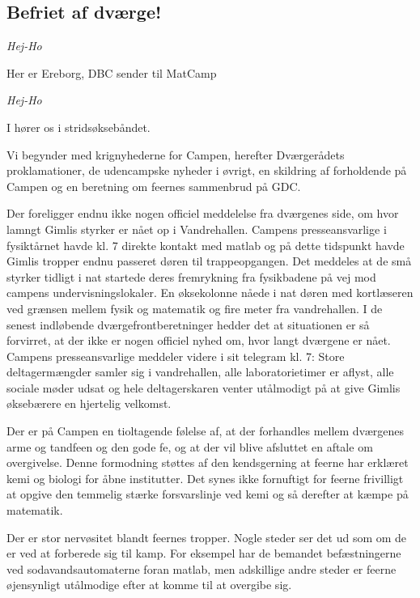 \begin{minipage}[t]{170mm}
\vspace{3mm}
\begin{center}
\section*{Befriet af dværge!}
\emph{Hej-Ho}

Her er Ereborg, DBC sender til MatCamp 

\emph{Hej-Ho}

I hører os i stridsøksebåndet. 

Vi begynder med krignyhederne for Campen, herefter Dværgerådets proklamationer, de udencampske nyheder i øvrigt, en skildring af forholdende på Campen og en beretning om feernes sammenbrud på GDC.

Der foreligger endnu ikke nogen officiel meddelelse fra dværgenes side, om hvor lamngt Gimlis styrker er nået op i Vandrehallen. Campens presseansvarlige i fysiktårnet havde kl. 7 direkte kontakt med matlab og på dette tidspunkt havde Gimlis tropper endnu passeret døren til trappeopgangen. Det meddeles at de små styrker tidligt i nat startede deres fremrykning fra fysikbadene på vej mod campens undervisningslokaler. En øksekolonne nåede i nat døren med kortlæseren ved grænsen mellem fysik og matematik og fire meter fra vandrehallen. I de senest indløbende dværgefrontberetninger hedder det at situationen er så forvirret, at der ikke er nogen officiel nyhed om, hvor langt dværgene er nået. Campens presseansvarlige meddeler videre i sit telegram kl. 7: Store deltagermængder samler sig i vandrehallen, alle laboratorietimer er aflyst, alle sociale møder udsat og hele deltagerskaren venter utålmodigt på at give Gimlis øksebærere en hjertelig velkomst.

Der er på Campen en tioltagende følelse af, at der forhandles mellem dværgenes arme og tandfeen og den gode fe, og at der vil blive afsluttet en aftale om overgivelse. Denne formodning støttes af den kendsgerning at feerne har erklæret kemi og biologi for åbne institutter. Det synes ikke fornuftigt for feerne frivilligt at opgive den temmelig stærke forsvarslinje ved kemi og så derefter at kæmpe på matematik.

Der er stor nervøsitet blandt feernes tropper. Nogle steder ser det ud som om de er ved at forberede sig til kamp. For eksempel har de bemandet befæstningerne ved sodavandsautomaterne foran matlab, men adskillige andre steder er feerne øjensynligt utålmodige efter at komme til at overgibe sig. 


\end{center}
\end{minipage}
